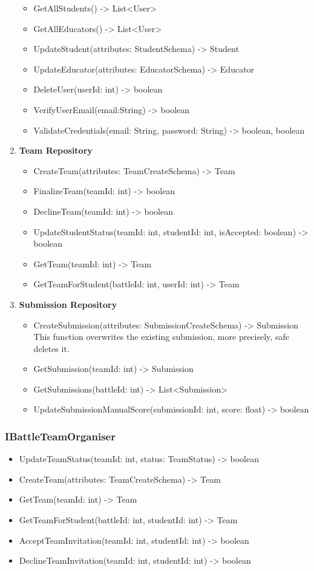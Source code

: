 \begin{enumerate}
\begin{itemize}
        \item GetAllStudents() -> List<User>
        \item GetAllEducators() -> List<User>
        \item UpdateStudent(attributes: StudentSchema) -> Student
        \item UpdateEducator(attributes: EducatorSchema) -> Educator
        \item DeleteUser(userId: int) -> boolean
        \item VerifyUserEmail(email:String) -> boolean
        \item ValidateCredentials(email: String, password: String) -> boolean, boolean
    \end{itemize}
    \item \textbf{Team Repository}
    \begin{itemize}
        \item CreateTeam(attributes: TeamCreateSchema) -> Team 
        \item FinalizeTeam(teamId: int) -> boolean
        \item DeclineTeam(teamId: int) -> boolean
        \item UpdateStudentStatus(teamId: int, studentId: int, isAccepted: boolean) -> boolean
        \item GetTeam(teamId: int) -> Team
        \item GetTeamForStudent(battleId: int, userId: int) -> Team
    \end{itemize}
    \item \textbf{Submission Repository}
    \begin{itemize}
        \item CreateSubmission(attributes: SubmissionCreateSchema) -> Submission \\
        This function overwrites the existing submission, more precisely, safe deletes it.
        \item GetSubmission(teamId: int) -> Submission
        \item GetSubmissions(battleId: int) -> List<Submission>
        \item UpdateSubmissionManualScore(submissionId: int, score: float) -> boolean
    \end{itemize}
\end{enumerate}
\subsubsection{IBattleTeamOrganiser}
\begin{itemize}
    \item UpdateTeamStatus(teamId: int, status: TeamStatus) -> boolean
    \item CreateTeam(attributes: TeamCreateSchema) -> Team
    \item GetTeam(teamId: int) -> Team
    \item GetTeamForStudent(battleId: int, studentId: int) -> Team
    \item AcceptTeamInvitation(teamId: int, studentId: int) -> boolean
    \item DeclineTeamInvitation(teamId: int, studentId: int) -> boolean
\end{itemize}
